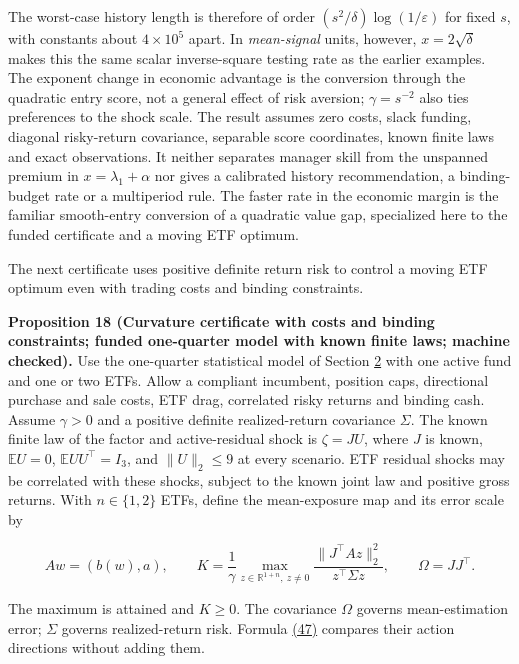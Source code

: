 \documentclass[11pt]{article}
\begin{document}
The worst-case history length is therefore of order
\((s^2/\delta)\log(1/\varepsilon)\) for fixed \(s\),
with constants about \(4\times10^5\) apart. In \emph{mean-signal}
units, however, \(x=2\sqrt\delta\) makes this the same
scalar inverse-square testing rate as the earlier examples.
The exponent change in economic advantage is the conversion
through the quadratic entry score, not a general effect of
risk aversion; \(\gamma=s^{-2}\) also ties preferences to
the shock scale. The result assumes zero costs, slack funding,
diagonal risky-return covariance, separable score coordinates,
known finite laws and exact observations. It neither separates
manager skill from the unspanned premium in
\(x=\lambda_1+\alpha\) nor gives a calibrated history
recommendation, a binding-budget rate or a multiperiod rule.
The faster rate in the economic margin is the familiar smooth-entry
conversion of a quadratic value gap, specialized here to the
funded certificate and a moving ETF optimum.

The next certificate uses positive definite return risk to
control a moving ETF optimum even with trading costs and
binding constraints.

\label{res:Proposition-18}
\textbf{Proposition 18 (Curvature certificate with costs and binding constraints; funded one-quarter model with known finite laws; machine checked).}
Use the one-quarter statistical model of Section \hyperref[sec:2]{2} with one active
fund and one or two ETFs. Allow a compliant incumbent, position
caps, directional purchase and sale costs, ETF drag, correlated
risky returns and binding cash. Assume \(\gamma>0\) and a
positive definite realized-return covariance \(\Sigma\). The
known finite law of the factor and active-residual shock is
\(\zeta=JU\), where \(J\) is known,
\(\mathbb E U=0\), \(\mathbb E UU^\top=I_3\), and
\(\|U\|_2\leq9\) at every scenario. ETF residual shocks may
be correlated with these shocks, subject to the known joint
law and positive gross returns. With \(n\in\{1,2\}\) ETFs,
define the mean-exposure map and its error scale by

\begin{equation*}
Aw=(b(w),a),\qquad
K=\frac1\gamma\max_{z\in\mathbb R^{1+n},\ z\ne0}
   \frac{\|J^\top A z\|_2^2}{z^\top\Sigma z},
\qquad \Omega=JJ^\top .\tag{47}\label{eq:47}
\end{equation*}

The maximum is attained and \(K\geq0\). The covariance
\(\Omega\) governs mean-estimation error; \(\Sigma\)
governs realized-return risk. Formula \hyperref[eq:47]{(47)} compares their
action directions without adding them.
\end{document}

